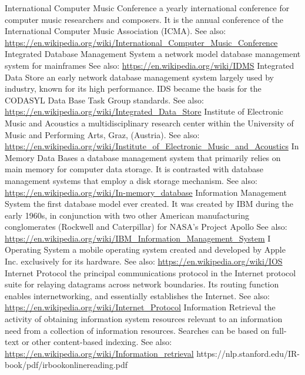 	{International Computer Music Conference}
	{ a yearly international conference for computer music researchers and composers. It is the annual conference of the International Computer Music Association (ICMA). See also: \url{https://en.wikipedia.org/wiki/International_Computer_Music_Conference}}
	{Integrated Database Management System}
	{a network model database management system for mainframes See also: \url{https://en.wikipedia.org/wiki/IDMS}}
	{Integrated Data Store}
	{an early network database management system largely used by industry, known for its high performance. IDS became the basis for the CODASYL Data Base Task Group standards. See also: \url{https://en.wikipedia.org/wiki/Integrated_Data_Store}}
	{Institute of Electronic Music and Acoustics}
	{ a multidisciplinary research center within the University of Music and Performing Arts, Graz, (Austria). See also: \url{https://en.wikipedia.org/wiki/Institute_of_Electronic_Music_and_Acoustics}}
	{In Memory Data Bases}
	{a database management system that primarily relies on main memory for computer data storage. It is contrasted with database management systems that employ a disk storage mechanism. See also: \url{https://en.wikipedia.org/wiki/In-memory_database}}
	{Information Management System}
	{the first database model ever created. It was created by IBM during the early 1960s, in conjunction with two other American manufacturing conglomerates (Rockwell and Caterpillar) for NASA's Project Apollo See also: \url{https://en.wikipedia.org/wiki/IBM_Information_Management_System}}
	{I Operating System}
	{ a mobile operating system created and developed by Apple Inc. exclusively for its hardware.  See also: \url{https://en.wikipedia.org/wiki/IOS}}
	{Internet Protocol}
	{the principal communications protocol in the Internet protocol suite for relaying datagrams across network boundaries. Its routing function enables internetworking, and essentially establishes the Internet. See also: \url{https://en.wikipedia.org/wiki/Internet_Protocol}}
	{Information Retrieval}
	{the activity of obtaining information system resources relevant to an information need from a collection of information resources. Searches can be based on full-text or other content-based indexing. See also: \url{https://en.wikipedia.org/wiki/Information_retrieval} https://nlp.stanford.edu/IR-book/pdf/irbookonlinereading.pdf}
